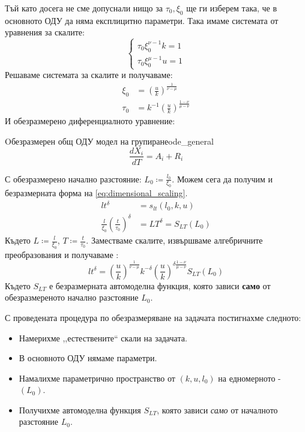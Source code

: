 Тъй като досега не сме допуснали нищо за $\tau_0, \xi_0$ ще ги изберем така, че в основното ОДУ да няма експлицитно параметри. Така имаме системата от уравнения за скалите:
\begin{equation}
    \begin{cases}
        \tau_0 \xi_0^{\nu-1} k = 1 \\
         \tau_0 \xi_0^{\mu-1} u = 1
    \end{cases} 
\end{equation}
Решаваме системата за скалите и получаваме:
\begin{align*}
    \xi_0 &= \left( \frac{u}{k} \right)^ {\frac{1}{\nu - \mu}} \\
    \tau_0 &= k^{-1} \left( \frac{u}{k} \right) ^ {\frac{1-\nu}{\mu - \nu}}
\end{align*}
И обезразмерено диференциалното уравнение:
\begin{result}{Oбезразмерен общ ОДУ модел на групиране}{ode_general}
    \begin{equation}
        \label{eq:non_dimenisonal_ode}
        \frac{d X_i}{d T} = A_i + R_i
    \end{equation}
\end{result}
С обезразмерено начално разстояние: $L_0 \coloneqq \frac{l_0}{\xi_0}$.
Можем сега да получим и безразмерната форма на \autoref{eq:dimensional_scaling}.
\begin{align*}
    l t^\delta &= s_{l t}(l_0, k, u) \\
    \frac{l}{\xi_0} \left(\frac{t}{\tau_0}\right)^{\delta} &= L T ^\delta = S_{L T} (L_0)
\end{align*}
Където $L \coloneqq \frac{l}{\xi_0}$, $T \coloneqq \frac{t}{\tau_0}$. Заместваме скалите, извършваме алгебричните преобразования и получаваме \cite{Krasteva2016}:
\begin{equation*}
    l t ^ \delta =  \left( \frac{u}{k} \right)^ {\frac{1}{\nu - \mu}} k^{-\delta} \left( \frac{u}{k} \right) ^ {\delta \frac{1-\nu}{\mu - \nu}} S_{L T} (L_0)
\end{equation*}
Където $S_{L T}$ е безразмерната автомоделна функция, която зависи \textbf{само} от обезразмереното начално разстояние $L_0$.

С проведената процедура по обезразмеряване на задачата постигнахме следното:
\begin{itemize}
    \item Намерихме ,,естествените`` скали на задачата.
    \item В основното ОДУ нямаме параметри.
    \item Намалихме параметрично пространство от $(k, u, l_0)$ на едномерното - $(L_0)$.
    \item Получихме автомоделна функция $S_{L T}$, която зависи \textit{само} от началното разстояние $L_0$.
\end{itemize}


